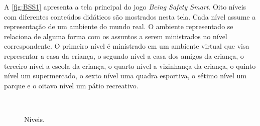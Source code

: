 \vspace{-0.3cm}

A \autoref{fig:BSS1} apresenta a tela principal do jogo \textit{Being Safety Smart}. Oito níveis com diferentes conteúdos didáticos são mostrados nesta tela. Cada nível assume a representação de um ambiente do mundo real. O ambiente representado se relaciona de alguma forma com os assuntos a serem ministrados no nível correspondente. O primeiro nível é ministrado em um ambiente virtual que visa representar a casa da criança, o segundo nível a casa dos amigos da criança, o terceiro nível a escola da criança, o quarto nível a vizinhança da criança, o quinto nível um supermercado, o sexto nível uma quadra esportiva, o sétimo nível um parque e o oitavo nível um pátio recreativo.


\begin{figure}%
  \vspace{-5pt}
  \caption{\label{fig:NiveisBBS}Níveis.}
  \vspace{-4pt}
  \vspace{-3pt}
  \\
  \vspace{-3pt}

\end{figure}
